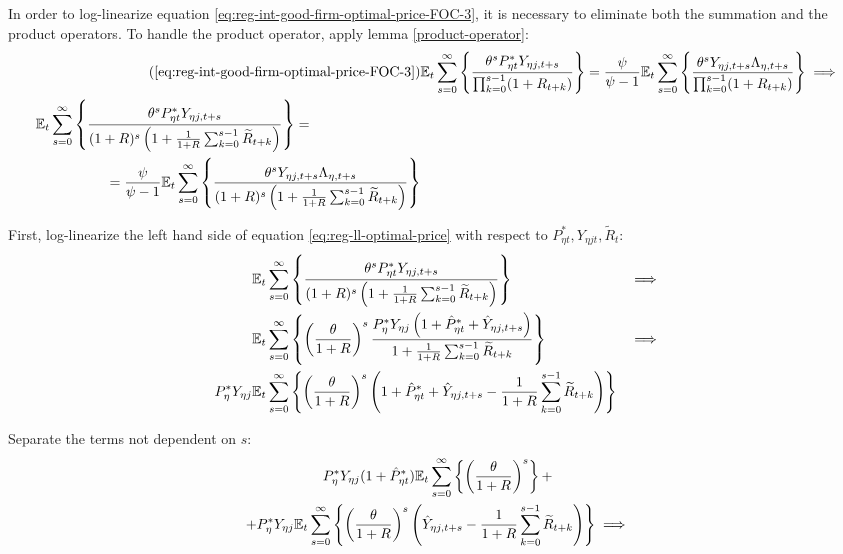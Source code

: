 \documentclass[
thesis.tex
]{subfiles}
\begin{document}
In order to log-linearize equation \ref{eq:reg-int-good-firm-optimal-price-FOC-3}, it is necessary to eliminate both the summation and the product operators. To handle the product operator, apply lemma \ref{product-operator}:
\begin{align}
	\tag{\ref{eq:reg-int-good-firm-optimal-price-FOC-3}}
	& \E \sum_{s=0}^{\infty} \left\{ \frac{\theta^s P_{\eta t}^{\ast} Y_{\eta j,t+s}}{ \prod_{k=0}^{s-1}(1+R_{t+k})} \right\} = \frac{\psi}{\psi-1} \E \sum_{s=0}^{\infty} \left\{ \frac{\theta^s Y_{\eta j,t+s} \Lambda_{\eta, t+s}}{\prod_{k=0}^{s-1}(1+R_{t+k})} \right\} \implies
	\\
	\begin{split}
		& \E \sum_{s=0}^{\infty} \left\{ \frac{\theta^s P_{\eta t}^{\ast} Y_{\eta j,t+s}}{ (1 + R)^s \left( 1 + \frac{1}{1 + R} \sum_{k=0}^{s-1} \widetilde{R}_{t+k} \right)} \right\} = 
		\\ & \quad \quad \quad \quad \quad = \frac{\psi}{\psi-1} \E \sum_{s=0}^{\infty} \left\{ \frac{\theta^s Y_{\eta j,t+s} \Lambda_{\eta, t+s}}{ (1 + R)^s \left( 1 + \frac{1}{1 + R} \sum_{k=0}^{s-1} \widetilde{R}_{t+k} \right)} \right\} \label{eq:reg-ll-optimal-price}
	\end{split}
\end{align}

First, log-linearize the left hand side of equation \ref{eq:reg-ll-optimal-price} with respect to \( P_{\eta t}^{\ast}, Y_{\eta j t}, \widetilde{R}_t \):
\begin{alignat}{2}
	& {\mathbb{E}_{t}} \sum_{s=0}^{\infty} \left\{ \frac{\theta^s P_{\eta t}^{\ast} Y_{\eta j,t+s}}{ (1 + R)^s \left( 1 + \frac{1}{1 + R} \sum_{k=0}^{s-1} \widetilde{R}_{t+k} \right)} \right\} &\implies \nonumber \\
	& {\mathbb{E}_{t}} \sum_{s=0}^{\infty} \left\{ \left( \frac{\theta}{1 + R} \right)^s  \frac{ P_{\eta}^{\ast} Y_{\eta j} \left( 1 + \hat{P}_{\eta t}^{\ast} + \hat{Y}_{\eta j, t+s} \right)}{ 1 + \frac{1}{1 + R} \sum_{k=0}^{s-1} \widetilde{R}_{t+k}} \right\} &\implies \nonumber \\
	P_{\eta}^{\ast} Y_{\eta j} &{\mathbb{E}_{t}} \sum_{s=0}^{\infty} \left\{ \left( \frac{\theta}{1 + R} \right)^s \left( 1 + \hat{P}_{\eta t}^{\ast} + \hat{Y}_{\eta j, t+s} - \frac{1}{1 + R} \sum_{k=0}^{s-1} \widetilde{R}_{t+k} \right) \right\} & \nonumber
\end{alignat}

Separate the terms not dependent on $s$:
\begin{multline}
	P_{\eta}^{\ast} Y_{\eta j} ( 1 + \hat{P}_{\eta t}^{\ast} ) {\mathbb{E}_{t}} \sum_{s=0}^{\infty} \left\{ \left( \frac{\theta}{1 + R} \right)^s \right\} + \\
	+ P_{\eta}^{\ast} Y_{\eta j} {\mathbb{E}_{t}} \sum_{s=0}^{\infty} \left\{ \left( \frac{\theta}{1 + R} \right)^s \left( \hat{Y}_{\eta j, t+s} - \frac{1}{1 + R} \sum_{k=0}^{s-1} \widetilde{R}_{t+k} \right) \right\} \implies \nonumber
\end{multline}
\end{document}
